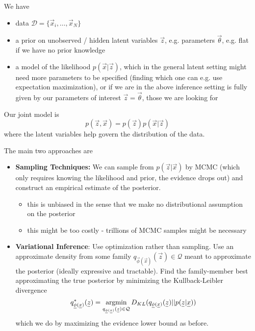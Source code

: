 We have
\begin{itemize}
    \item data $\mathcal{D} = \{ \vec{x}_i, \dots, \vec{x}_N \}$
    \item a prior on unobserved / hidden latent variables $\vec{z}$, e.g. parameters $\vec{\theta}$, e.g. flat if we have no prior knowledge
    \item a model of the likelihood $p(\vec{x}|\vec{z})$, which in the general latent setting might need more parameters
    to be specified (finding which one can e.g. use expectation maximization), or if we are in the above inference setting
    is fully given by our parameters of interest $\vec{z} = \vec{\theta}$, those we are looking for
\end{itemize}

Our joint model is
\begin{equation}
    p(\vec{z},\vec{x}) = p(\vec{z}) p(\vec{x}|\vec{z})
\end{equation}
where the latent variables help govern the distribution of the data.


The main two approaches are
\begin{itemize}
    \item \textbf{Sampling Techniques:} We can sample from $p(\vec{z}|\vec{x})$ by MCMC (which only requires knowing the
    likelihood and prior, the evidence drops out) and construct an empirical estimate of the posterior.
    \begin{itemize}
        \item \textcolor{green1}{this is unbiased in the sense that we make no distributional assumption on the posterior}
        \item \textcolor{red1}{this might be too costly - trillions of MCMC samples might be necessary}
    \end{itemize}
    \item \textbf{Variational Inference}: Use optimization rather than sampling. Use an approximate
    density from some family $q_{\vec{\phi}(\vec{x})}(\vec{z}) \in \mathcal{Q}$ meant to approximate the posterior (ideally expressive and tractable). Find the family-member
    best approximating the true posterior by minimizing the Kullback-Leibler divergence
    \begin{equation}
        q_{\vec{\phi}(\vec{x})}^*(\vec{z}) = \argmin_{q_{\vec{\phi}(\vec{x})}(\vec{z}) \in \mathcal{Q}} D_{KL}(q_{\vec{\phi}(\vec{x})}(\vec{z})||p(\vec{z}|\vec{x}))
    \end{equation}
    which we do by maximizing the evidence lower bound as before.
\end{itemize}

